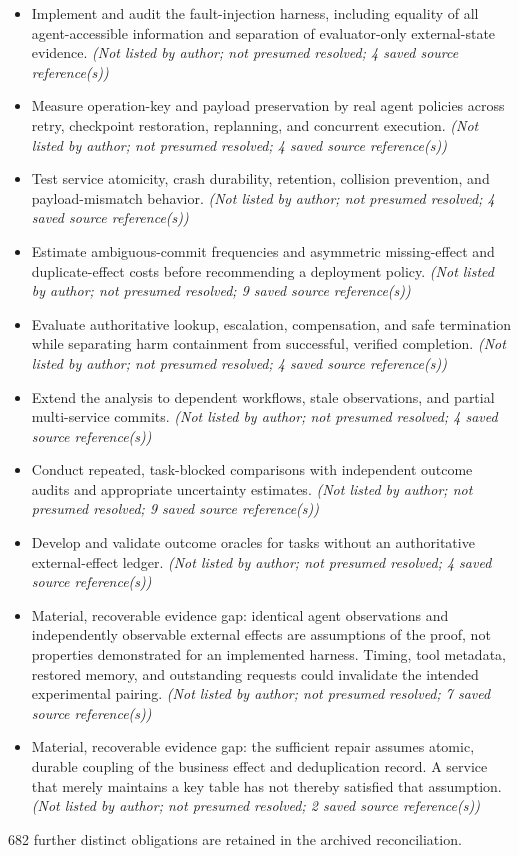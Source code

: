\documentclass[11pt]{article}
\begin{document}
\begin{itemize}
\item Implement and audit the fault-injection harness, including equality of all agent-accessible information and separation of evaluator-only external-state evidence. \textit{ (Not listed by author; not presumed resolved; 4 saved source reference(s))}
\item Measure operation-key and payload preservation by real agent policies across retry, checkpoint restoration, replanning, and concurrent execution. \textit{ (Not listed by author; not presumed resolved; 4 saved source reference(s))}
\item Test service atomicity, crash durability, retention, collision prevention, and payload-mismatch behavior. \textit{ (Not listed by author; not presumed resolved; 4 saved source reference(s))}
\item Estimate ambiguous-commit frequencies and asymmetric missing-effect and duplicate-effect costs before recommending a deployment policy. \textit{ (Not listed by author; not presumed resolved; 9 saved source reference(s))}
\item Evaluate authoritative lookup, escalation, compensation, and safe termination while separating harm containment from successful, verified completion. \textit{ (Not listed by author; not presumed resolved; 4 saved source reference(s))}
\item Extend the analysis to dependent workflows, stale observations, and partial multi-service commits. \textit{ (Not listed by author; not presumed resolved; 4 saved source reference(s))}
\item Conduct repeated, task-blocked comparisons with independent outcome audits and appropriate uncertainty estimates. \textit{ (Not listed by author; not presumed resolved; 9 saved source reference(s))}
\item Develop and validate outcome oracles for tasks without an authoritative external-effect ledger. \textit{ (Not listed by author; not presumed resolved; 4 saved source reference(s))}
\item Material, recoverable evidence gap: identical agent observations and independently observable external effects are assumptions of the proof, not properties demonstrated for an implemented harness. Timing, tool metadata, restored memory, and outstanding requests could invalidate the intended experimental pairing. \textit{ (Not listed by author; not presumed resolved; 7 saved source reference(s))}
\item Material, recoverable evidence gap: the sufficient repair assumes atomic, durable coupling of the business effect and deduplication record. A service that merely maintains a key table has not thereby satisfied that assumption. \textit{ (Not listed by author; not presumed resolved; 2 saved source reference(s))}
\end{itemize}
682 further distinct obligations are retained in the archived reconciliation.
\end{document}
